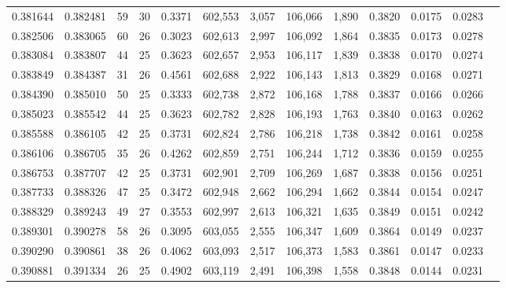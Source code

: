 \begin{tabular}{rrrrrrrrrrrrr}
0.381644 & 0.382481 &  59 &  30 &                                     0.3371 & 602,553 &   3,057 & 106,066 &   1,890 & 0.3820 & 0.0175 & 0.0283 \\
0.382506 & 0.383065 &  60 &  26 &                                     0.3023 & 602,613 &   2,997 & 106,092 &   1,864 & 0.3835 & 0.0173 & 0.0278 \\
0.383084 & 0.383807 &  44 &  25 &                                     0.3623 & 602,657 &   2,953 & 106,117 &   1,839 & 0.3838 & 0.0170 & 0.0274 \\
0.383849 & 0.384387 &  31 &  26 &                                     0.4561 & 602,688 &   2,922 & 106,143 &   1,813 & 0.3829 & 0.0168 & 0.0271 \\
0.384390 & 0.385010 &  50 &  25 &                                     0.3333 & 602,738 &   2,872 & 106,168 &   1,788 & 0.3837 & 0.0166 & 0.0266 \\
0.385023 & 0.385542 &  44 &  25 &                                     0.3623 & 602,782 &   2,828 & 106,193 &   1,763 & 0.3840 & 0.0163 & 0.0262 \\
0.385588 & 0.386105 &  42 &  25 &                                     0.3731 & 602,824 &   2,786 & 106,218 &   1,738 & 0.3842 & 0.0161 & 0.0258 \\
0.386106 & 0.386705 &  35 &  26 &                                     0.4262 & 602,859 &   2,751 & 106,244 &   1,712 & 0.3836 & 0.0159 & 0.0255 \\
0.386753 & 0.387707 &  42 &  25 &                                     0.3731 & 602,901 &   2,709 & 106,269 &   1,687 & 0.3838 & 0.0156 & 0.0251 \\
0.387733 & 0.388326 &  47 &  25 &                                     0.3472 & 602,948 &   2,662 & 106,294 &   1,662 & 0.3844 & 0.0154 & 0.0247 \\
0.388329 & 0.389243 &  49 &  27 &                                     0.3553 & 602,997 &   2,613 & 106,321 &   1,635 & 0.3849 & 0.0151 & 0.0242 \\
0.389301 & 0.390278 &  58 &  26 &                                     0.3095 & 603,055 &   2,555 & 106,347 &   1,609 & 0.3864 & 0.0149 & 0.0237 \\
0.390290 & 0.390861 &  38 &  26 &                                     0.4062 & 603,093 &   2,517 & 106,373 &   1,583 & 0.3861 & 0.0147 & 0.0233 \\
0.390881 & 0.391334 &  26 &  25 &                                     0.4902 & 603,119 &   2,491 & 106,398 &   1,558 & 0.3848 & 0.0144 & 0.0231 \\

\end{tabular}

